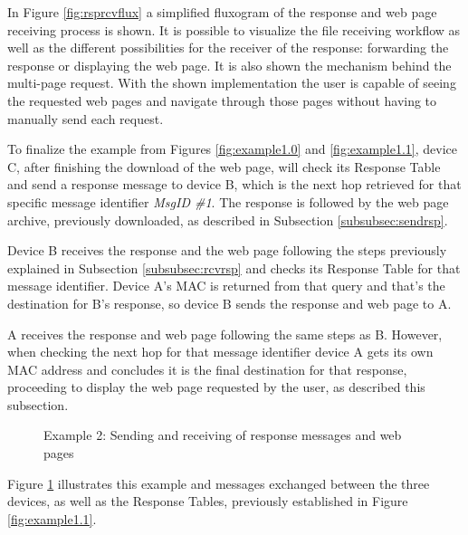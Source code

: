 In Figure \ref{fig:rsprcvflux} a simplified fluxogram of the response and web page receiving process is shown. It is possible to visualize the file receiving workflow as well as the different possibilities for the receiver of the response: forwarding the response or displaying the web page. It is also shown the mechanism behind the multi-page request. With the shown implementation the user is capable of seeing the requested web pages and navigate through those pages without having to manually send each request.

To finalize the example from Figures \ref{fig:example1.0} and \ref{fig:example1.1}, device C, after finishing the download of the web page, will check its Response Table and send a response message to device B, which is the next hop retrieved for that specific message identifier \textit{MsgID \#1}. The response is followed by the web page archive, previously downloaded, as described in Subsection \ref{subsubsec:sendrsp}.

Device B receives the response and the web page following the steps previously explained in Subsection \ref{subsubsec:rcvrsp} and checks its Response Table for that message identifier. Device A's \gls{MAC} is returned from that query and that's the destination for B's response, so device B sends the response and web page to A.

A receives the response and web page following the same steps as B. However, when checking the next hop for that message identifier device A gets its own \gls{MAC} address and concludes it is the final destination for that response, proceeding to display the web page requested by the user, as described this subsection.

\begin{figure}[ht]
   \noindent{}
	\caption{\label{fig:example1.2} Example 2: Sending and receiving of response messages and web pages}
\end{figure}

Figure \ref{fig:example1.2} illustrates this example and messages exchanged between the three devices, as well as the Response Tables, previously established in Figure \ref{fig:example1.1}.











